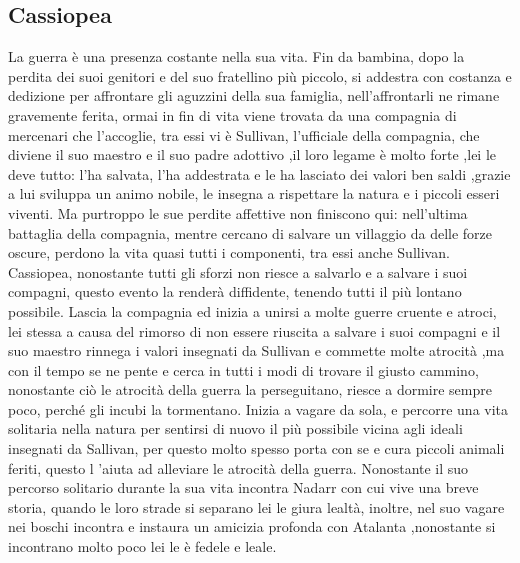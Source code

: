 \documentclass{article}
\begin{document}
          \subsection{Cassiopea}La guerra è una presenza costante nella sua vita. Fin da bambina, dopo la perdita dei suoi genitori e del suo fratellino più piccolo, si addestra con costanza e dedizione per affrontare gli aguzzini della sua famiglia, nell’affrontarli ne rimane gravemente ferita, ormai in fin di vita viene trovata da una compagnia di mercenari che l’accoglie, tra essi vi è Sullivan, l’ufficiale della compagnia, che diviene il suo maestro e il suo padre adottivo ,il loro legame è molto forte ,lei le deve tutto: l’ha salvata, l’ha addestrata e le ha lasciato dei valori ben saldi ,grazie a lui sviluppa un animo nobile, le insegna a rispettare la natura e i piccoli esseri viventi. Ma purtroppo le sue perdite affettive non finiscono qui: nell’ultima battaglia della compagnia, mentre cercano di salvare un villaggio da delle forze oscure, perdono la vita quasi tutti i componenti, tra essi anche Sullivan. Cassiopea, nonostante tutti gli sforzi non riesce a salvarlo e a salvare i suoi compagni, questo evento la renderà diffidente, tenendo tutti il più lontano possibile. Lascia la compagnia ed inizia a unirsi a molte guerre cruente e atroci, lei stessa a causa del rimorso di non essere riuscita a salvare i suoi compagni e il suo maestro rinnega i valori insegnati da Sullivan e commette molte atrocità ,ma con il tempo se ne pente e cerca in tutti i modi di trovare il giusto cammino, nonostante ciò le atrocità della guerra la perseguitano, riesce a dormire sempre poco, perché gli incubi la tormentano. Inizia a vagare da sola, e percorre una vita solitaria nella natura per sentirsi di nuovo il più possibile vicina agli ideali insegnati da Sallivan, per questo molto spesso porta con se e cura piccoli animali feriti, questo l ’aiuta ad alleviare le atrocità della guerra. Nonostante il suo percorso solitario durante la sua vita incontra Nadarr con cui vive una breve storia, quando le loro strade si separano lei le giura lealtà, inoltre, nel suo vagare nei boschi incontra e instaura un amicizia profonda con Atalanta ,nonostante si incontrano molto poco lei le è fedele e leale.
\end{document}
